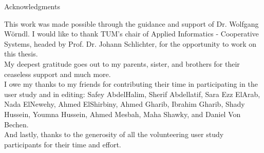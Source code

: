 \thispagestyle{empty}

\vspace*{2cm}

\begin{center}
{ Acknowledgments}
\end{center}

\vspace{1cm}
This work was made possible through the guidance and support of Dr. Wolfgang
W\"{o}rndl. I would like to thank TUM's chair of Applied Informatics - Cooperative
Systems, headed by Prof. Dr. Johann Schlichter, for the opportunity to work on
this thesis.\\
My deepest gratitude goes out to my parents, sister, and brothers for their
ceaseless support and much more.\\
I owe my thanks to my friends for contributing their time in participating
in the user study and in editing: Safey AbdelHalim, Sherif Abdellatif, Sara
Ezz ElArab, Nada ElNewehy, Ahmed ElShirbiny, Ahmed Gharib, Ibrahim Gharib, Shady
Hussein, Youmna Hussein, Ahmed Mesbah, Maha Shawky, and Daniel Von Bechen.\\
And lastly, thanks to the generosity of all the volunteering
user study participants for their time and effort.

\cleardoublepage{}
